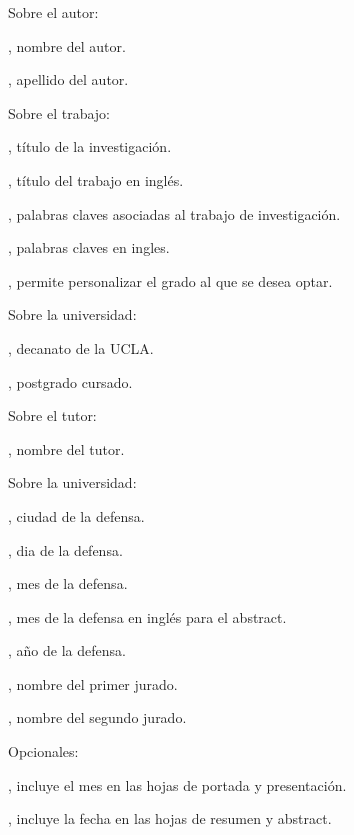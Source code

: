 
\noindent Sobre el autor:

\pa, nombre del autor.

\pa, apellido del autor.

\espaciodoble
\noindent Sobre el trabajo:

\pa, título de la investigación.

\pa, título del trabajo en inglés.

\pa, palabras claves asociadas al trabajo de investigación.

\pa, palabras claves en ingles.

\pa, permite personalizar el grado al que se desea optar.

\espaciodoble
\noindent Sobre la universidad:

\pa, decanato de la UCLA.

\pa, postgrado cursado.

\espaciodoble
\noindent Sobre el tutor:

\pa, nombre del tutor.

\espaciodoble
\noindent Sobre la universidad:

\pa, ciudad de la defensa.

\pa, dia de la defensa.

\pa, mes de la defensa.

\pa, mes de la defensa en inglés para el abstract.

\pa, año de la defensa.

\pa, nombre del primer jurado.

\pa, nombre del segundo jurado.

\espaciodoble
\noindent Opcionales:

, incluye el mes en las hojas de portada y presentación.

, incluye la fecha en las hojas de resumen y abstract.
